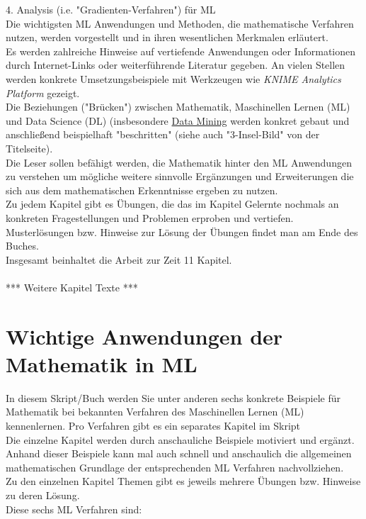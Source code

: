 \documentclass[12pt]{article}
\begin{document}
4.	Analysis (i.e. "Gradienten-Verfahren") für ML\\[0.5cm]
%
Die wichtigsten ML Anwendungen und Methoden, die mathematische Verfahren nutzen, werden vorgestellt und in ihren wesentlichen Merkmalen erläutert.\\
Es werden zahlreiche Hinweise auf vertiefende Anwendungen oder Informationen durch Internet-Links oder weiterführende Literatur gegeben. An vielen Stellen werden konkrete Umsetzungsbeispiele mit Werkzeugen wie \textit{KNIME Analytics Platform} gezeigt. \\
Die Beziehungen ("Brücken") zwischen Mathematik, Maschinellen Lernen (ML) und Data Science (DL) (insbesondere \href{https://en.wikipedia.org/wiki/Data_mining}{Data Mining} werden konkret gebaut und anschließend beispielhaft "beschritten" (siehe auch "3-Insel-Bild" von der Titelseite).\\ 
Die Leser sollen befähigt werden, die Mathematik hinter den ML Anwendungen zu verstehen um mögliche weitere sinnvolle Ergänzungen und Erweiterungen die sich aus dem mathematischen Erkenntnisse ergeben zu nutzen.\\
Zu jedem Kapitel gibt es Übungen, die das im Kapitel Gelernte nochmals an konkreten Fragestellungen und Problemen erproben und vertiefen. Musterlösungen bzw. Hinweise zur Lösung der Übungen findet man am Ende des Buches.\\
Insgesamt beinhaltet die Arbeit zur Zeit 11 Kapitel.\\
\\
*** Weitere Kapitel Texte *** 


\newpage

\section{Wichtige Anwendungen der Mathematik in ML}

In diesem Skript/Buch werden Sie unter anderen sechs konkrete Beispiele für Mathematik bei bekannten Verfahren des Maschinellen Lernen (ML) kennenlernen. Pro Verfahren gibt es ein separates Kapitel im Skript\\
Die einzelne Kapitel werden durch anschauliche Beispiele motiviert und  ergänzt. Anhand dieser Beispiele kann mal auch schnell und anschaulich die allgemeinen mathematischen Grundlage der entsprechenden ML Verfahren nachvollziehen.\\
Zu den einzelnen Kapitel Themen gibt es jeweils mehrere Übungen bzw. Hinweise zu deren Lösung.\\
Diese sechs ML Verfahren sind:\\
\end{document}
